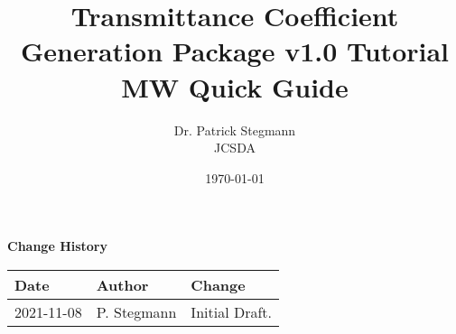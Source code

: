 

\title{Transmittance Coefficient Generation Package v1.0 Tutorial\\ \normalsize{MW Quick Guide}}
\author{Dr. Patrick Stegmann\\ JCSDA}
\date{\today}




\maketitle


\tableofcontents

\newpage

\thispagestyle{empty}
\vspace*{10cm}
\begin{center}
  {\sffamily\Large\bfseries Change History}
  \begin{table}[htp]
    \centering
    \begin{tabular}{|p{2cm}|p{3cm}|p{8cm}|}
      \hline
      \sffamily\textbf{Date} & \sffamily\textbf{Author} & \sffamily\textbf{Change}\\
      \hline\hline
      2021-11-08 & P. Stegmann& Initial Draft.\\
      \hline
    \end{tabular}
  \end{table}
\end{center}
\clearpage
{}
\setcounter{page}{1}










